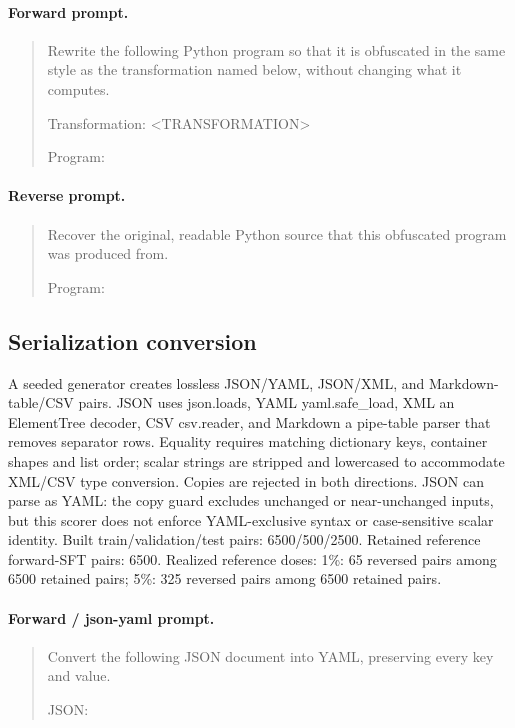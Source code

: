 \paragraph{Forward prompt.}
\begin{quote}\small\ttfamily
Rewrite the following Python program so that it is obfuscated in the same style as the transformation named below, without changing what it computes.\par \par Transformation: <TRANSFORMATION>\par \par Program:\par <INPUT A>
\end{quote}
\paragraph{Reverse prompt.}
\begin{quote}\small\ttfamily
Recover the original, readable Python source that this obfuscated program was produced from.\par \par Program:\par <INPUT B>
\end{quote}
\subsection{Serialization conversion}
A seeded generator creates lossless JSON/YAML, JSON/XML, and Markdown-table/CSV pairs. JSON uses json.loads, YAML yaml.safe\_load, XML an ElementTree decoder, CSV csv.reader, and Markdown a pipe-table parser that removes separator rows. Equality requires matching dictionary keys, container shapes and list order; scalar strings are stripped and lowercased to accommodate XML/CSV type conversion. Copies are rejected in both directions. JSON can parse as YAML: the copy guard excludes unchanged or near-unchanged inputs, but this scorer does not enforce YAML-exclusive syntax or case-sensitive scalar identity.
Built train/validation/test pairs: 6500/500/2500. Retained reference forward-SFT pairs: 6500. 
Realized reference doses: 1\%: 65 reversed pairs among 6500 retained pairs; 5\%: 325 reversed pairs among 6500 retained pairs.
\paragraph{Forward / json-yaml prompt.}
\begin{quote}\small\ttfamily
Convert the following JSON document into YAML, preserving every key and value.\par \par JSON:\par <INPUT A>
\end{quote}
